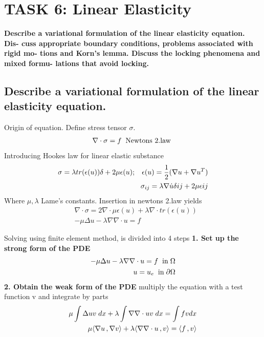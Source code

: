 \documentclass[a4paper,norsk]{article}
\begin{document}
\newpage \newpage
\section*{TASK 6: Linear Elasticity}
\textbf{Describe a variational formulation of the linear elasticity equation.  Dis-
cuss appropriate boundary conditions, problems associated with rigid mo-
tions and Korn's lemma.  Discuss the locking phenomena and mixed formu-
lations that avoid locking.}

\subsection*{Describe a variational formulation of the linear elasticity equation.}
Origin of equation. Define stress tensor $\sigma$. 
\begin{align*}
\nabla \cdot \sigma = f \hspace{2mm} \text{Newtons 2.law }
\end{align*}
Introducing Hookes law for linear elastic substance
\begin{align*}
\sigma = \lambda tr(\epsilon(u)) \delta + 2 \mu \epsilon(u); \hspace{3mm} \epsilon(u) = \frac{1}{2}(\nabla u + \nabla u^T) \\ 
\sigma_{ij} = \lambda \nabla \dot u \delta{ij} + 2 \mu \epsilon{ij}
\end{align*} 
Where $\mu, \lambda$ Lame's constants. Insertion in newtons 2.law yields
\begin{align*}
&\nabla \cdot \sigma = 2 \nabla \cdot \mu \epsilon(u) + \lambda \nabla \cdot tr(\epsilon(u)) \\
&- \mu \Delta u - \lambda \nabla \nabla \cdot u = f
\end{align*}

Solving using finite element method, is divided into 4 steps \newline
\textbf{1. Set up the strong form of the PDE} 
\begin{align*}
- \mu \Delta u - \lambda \nabla \nabla \cdot u = f \hspace{2mm} \text{in} \hspace{1mm} \Omega  \\
u = u_e \hspace{2mm} \text{in} \hspace{1mm} \partial \Omega
\end{align*} 
\textbf{2. Obtain the weak form of the PDE} multiply the equation with a test function v and integrate by parts
\begin{align*}
\mu \int \Delta u v \hspace{1mm} dx + \lambda \int \nabla \nabla \cdot u v \hspace{1mm} dx = \int f v dx\\ 
\mu \langle \nabla u \,, \nabla v \rangle + \lambda \langle \nabla \nabla \cdot u \,, v \rangle 
= \langle f \,, v \rangle
\end{align*}
\end{document}
